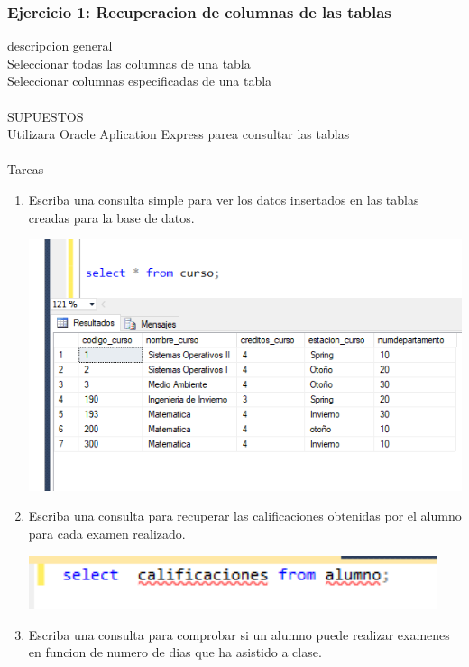 \documentclass[12pt,letterpaper]{article}
\begin{document}
\subsubsection{Ejercicio 1: Recuperacion de columnas de las tablas} 
descripcion general  \\
Seleccionar todas las columnas de una tabla\\
Seleccionar columnas especificadas de una tabla\\
\\
SUPUESTOS \\
Utilizara Oracle Aplication Express parea consultar las tablas\\
\\Tareas
\begin{enumerate}[1.]
    \item Escriba una consulta simple para ver los datos insertados en las tablas creadas para la base de datos.
    
\begin{center}
\includegraphics[width=15cm]{./IMAGENES/imagen6_1}
\end{center}

    
    
    \item Escriba una consulta para recuperar las calificaciones obtenidas por el alumno para cada examen realizado.
    
    
\begin{center}
\includegraphics[width=12cm]{./IMAGENES/imagen6_2}
\end{center}

    
    \item Escriba una consulta para comprobar si un alumno puede realizar examenes en funcion de numero de dias que ha asistido a clase.
    

\end{enumerate}
\end{document}
